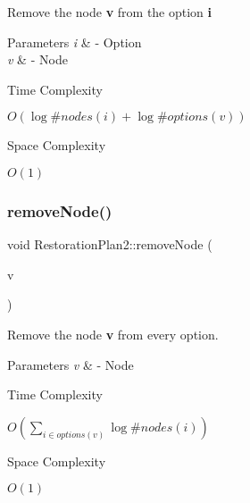 Remove the node {\bfseries v} from the option {\bfseries i} 


\begin{DoxyParams}{Parameters}
{\em i} & -\/ Option \\
\hline
{\em v} & -\/ Node \\
\hline
\end{DoxyParams}
\begin{DoxyRefDesc}{Time Complexity}
\item[\hyperlink{time__time000015}{Time Complexity}]$O(\log \#nodes(i) + \log \#options(v))$ \end{DoxyRefDesc}
\begin{DoxyRefDesc}{Space Complexity}
\item[\hyperlink{space__space000015}{Space Complexity}]$O(1)$ \end{DoxyRefDesc}
\mbox{\label{class_restoration_plan2_acd618be603d5562d48c0ece65210750f}} 
\subsubsection{\texorpdfstring{remove\+Node()}{removeNode()}\hspace{0.1cm}{\footnotesize\ttfamily [2/2]}}
{\footnotesize\ttfamily void Restoration\+Plan2\+::remove\+Node (\begin{DoxyParamCaption}\item[{Graph\+\_\+t\+::\+Node}]{v }\end{DoxyParamCaption})\hspace{0.3cm}{\ttfamily [inline]}}



Remove the node {\bfseries v} from every option. 


\begin{DoxyParams}{Parameters}
{\em v} & -\/ Node \\
\hline
\end{DoxyParams}
\begin{DoxyRefDesc}{Time Complexity}
\item[\hyperlink{time__time000017}{Time Complexity}]$O(\sum_{i \in options(v)} \log \#nodes(i))$ \end{DoxyRefDesc}
\begin{DoxyRefDesc}{Space Complexity}
\item[\hyperlink{space__space000017}{Space Complexity}]$O(1)$ \end{DoxyRefDesc}
\mbox{\label{class_restoration_plan2_aea25e41ec7132080a756a57cde477c65}} 
